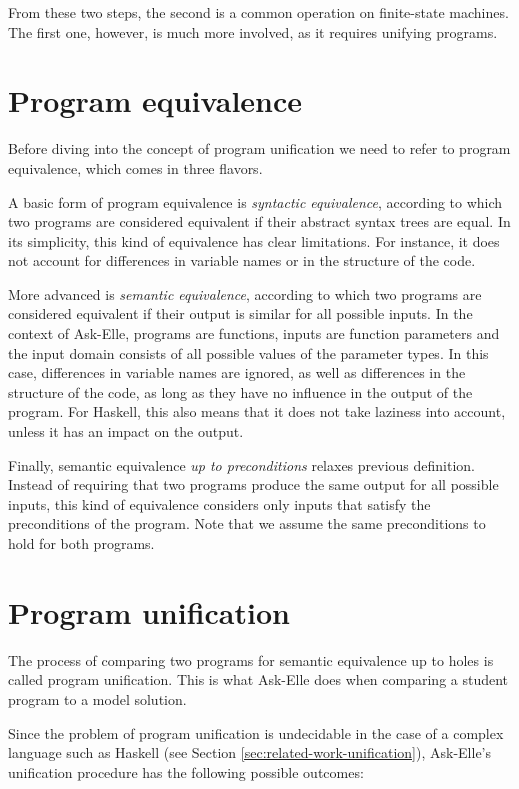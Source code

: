 From these two steps, the second is a common operation on finite-state machines. The first one, however, is much more involved, as it requires unifying programs.

\section{Program equivalence}
\label{sec:bg-program-equivalence}

Before diving into the concept of program unification we need to refer to program equivalence, which comes in three flavors.

A basic form of program equivalence is \emph{syntactic equivalence}, according to which two programs are considered equivalent if their abstract syntax trees are equal. In its simplicity, this kind of equivalence has clear limitations. For instance, it does not account for differences in variable names or in the structure of the code.

More advanced is \emph{semantic equivalence}, according to which two programs are considered equivalent if their output is similar for all possible inputs. In the context of Ask-Elle, programs are functions, inputs are function parameters and the input domain consists of all possible values of the parameter types. In this case, differences in variable names are ignored, as well as differences in the structure of the code, as long as they have no influence in the output of the program. For Haskell, this also means that it does not take laziness into account, unless it has an impact on the output.

Finally, semantic equivalence \emph{up to preconditions} relaxes previous definition. Instead of requiring that two programs produce the same output for all possible inputs, this kind of equivalence considers only inputs that satisfy the preconditions of the program. Note that we assume the same preconditions to hold for both programs.

\section{Program unification}
\label{sec:bg-unification}

The process of comparing two programs for semantic equivalence up to holes is called program unification. This is what Ask-Elle does when comparing a student program to a model solution.

Since the problem of program unification is undecidable in the case of a complex language such as Haskell (see Section \ref{sec:related-work-unification}), Ask-Elle's unification procedure has the following possible outcomes:

